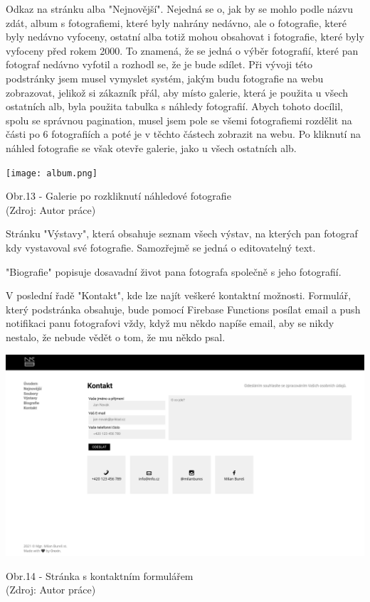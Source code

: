 \documentclass[12pt,a4paper]{report}
\begin{document}
  Odkaz na stránku alba "Nejnovější". Nejedná se o, jak by se mohlo podle názvu zdát, album s
  fotografiemi, které byly nahrány nedávno, ale o fotografie, které byly nedávno vyfoceny, ostatní
  alba totiž mohou obsahovat i fotografie, které byly vyfoceny před rokem 2000. To znamená, že se
  jedná o výběr fotografií, které pan fotograf nedávno vyfotil a rozhodl se, že je bude sdílet. Při
  vývoji této podstránky jsem musel vymyslet systém, jakým budu fotografie na webu zobrazovat,
  jelikož si zákazník přál, aby místo galerie, která je použita u všech ostatních alb, byla použita
  tabulka s náhledy fotografií. Abych tohoto docílil, spolu se správnou pagination, musel jsem pole
  se všemi fotografiemi rozdělit na části po 6 fotografiích a poté je v těchto částech zobrazit na
  webu. Po kliknutí na náhled fotografie se však otevře galerie, jako u všech ostatních alb.
  
  \vspace*{0.5cm}
  \noindent\texttt{[image: album.png]}
  \begin{center}
    Obr.13 - Galerie po rozkliknutí náhledové fotografie  \\
    (Zdroj: Autor práce)
  \end{center}
  \vspace*{0.5cm}
 
  Stránku "Výstavy", která obsahuje seznam všech výstav, na kterých pan fotograf kdy vystavoval
  své fotografie. Samozřejmě se jedná o editovatelný text.
  
  "Biografie" popisuje dosavadní život pana fotografa společně s jeho fotografií.
  
  V poslední řadě "Kontakt", kde lze najít veškeré kontaktní možnosti. Formulář, který podstránka
  obsahuje, bude pomocí Firebase Functions posílat email a push notifikaci panu fotografovi vždy,
  když mu někdo napíše email, aby se nikdy nestalo, že nebude vědět o tom, že mu někdo psal.

  \vspace*{0.5cm}
  \noindent\includegraphics[width=\linewidth]{contact.png}
  \begin{center}
    Obr.14 -  Stránka s kontaktním formulářem \\
    (Zdroj: Autor práce)
  \end{center}
  \vspace*{0.5cm}
\end{document}
